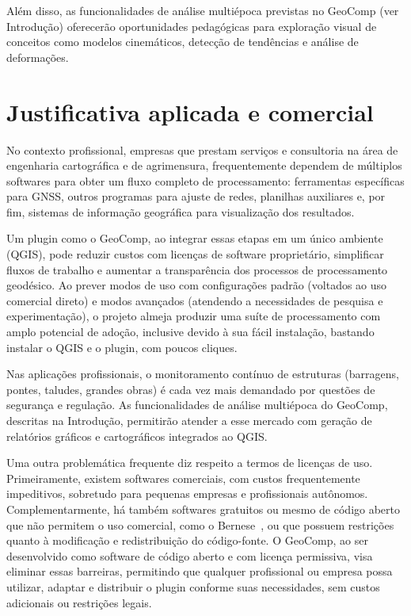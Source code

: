 \documentclass[
        12pt,                           %
        openright,                      %
        oneside,
        a4paper,                        %
        chapter=TITLE,         %
        section=TITLE,         %
        subsection=Title,      %
        english,                        %
        portugues,                      %
        ]{abntex2}
\begin{document}
Além disso, as funcionalidades de análise multiépoca previstas no GeoComp (ver Introdução) oferecerão oportunidades pedagógicas para exploração visual de conceitos como modelos cinemáticos, detecção de tendências e análise de deformações.


\section{Justificativa aplicada e comercial}

No contexto profissional, empresas que prestam serviços e consultoria na área de engenharia cartográfica e de agrimensura, frequentemente dependem de múltiplos softwares para obter um fluxo completo de processamento: ferramentas específicas para GNSS, outros programas para ajuste de redes, planilhas auxiliares e, por fim, sistemas de informação geográfica para visualização dos resultados.

Um plugin como o GeoComp, ao integrar essas etapas em um único ambiente (QGIS), pode reduzir custos com licenças de software proprietário, simplificar fluxos de trabalho e aumentar a transparência dos processos de processamento geodésico. Ao prever modos de uso com configurações padrão (voltados ao uso comercial direto) e modos avançados (atendendo a necessidades de pesquisa e experimentação), o projeto almeja produzir uma suíte de processamento com amplo potencial de adoção, inclusive devido à sua fácil instalação, bastando instalar o QGIS e o plugin, com poucos cliques.

Nas aplicações profissionais, o monitoramento contínuo de estruturas (barragens, pontes, taludes, grandes obras) é cada vez mais demandado por questões de segurança e regulação. As funcionalidades de análise multiépoca do GeoComp, descritas na Introdução, permitirão atender a esse mercado com geração de relatórios gráficos e cartográficos integrados ao QGIS.

Uma outra problemática frequente diz respeito a termos de licenças de uso. Primeiramente, existem softwares comerciais, com custos frequentemente impeditivos, sobretudo para pequenas empresas e profissionais autônomos. Complementarmente, há também softwares gratuitos ou mesmo de código aberto que não permitem o uso comercial, como o Bernese~\cite{bernese}, ou que possuem restrições quanto à modificação e redistribuição do código-fonte. O GeoComp, ao ser desenvolvido como software de código aberto e com licença permissiva, visa eliminar essas barreiras, permitindo que qualquer profissional ou empresa possa utilizar, adaptar e distribuir o plugin conforme suas necessidades, sem custos adicionais ou restrições legais.
\end{document}
